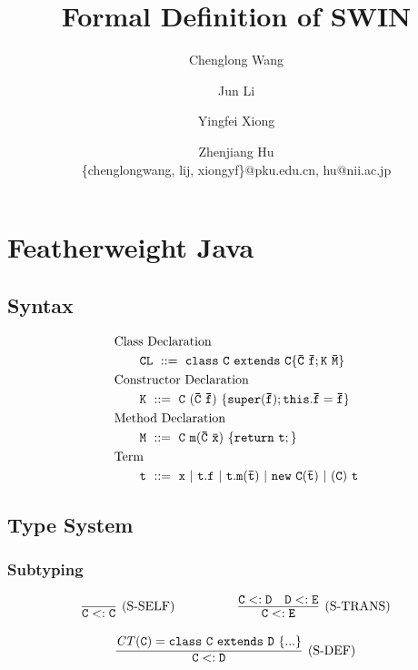\documentclass[letterpaper]{article}
\begin{document}
\title{Formal Definition of SWIN}
\author{Chenglong Wang \and Jun Li \and Yingfei Xiong \and Zhenjiang Hu \\ \{chenglongwang, lij, xiongyf\}@pku.edu.cn, hu@nii.ac.jp}

\date{}
\maketitle

\section{Featherweight Java}
\subsection{Syntax}
\begin{align*}
  & \mbox{Class Declaration}\\
  & \qquad\tt CL\ ::=\  \tt class\ C\ extends\ C \{\bar{C}\ \bar{f}; K\ \bar{M}\}\\
  & \mbox{Constructor Declaration}\\
  & \qquad\tt K \ ::=\  \tt C\ (\bar{C}\ \bar{f})\ \{ super(\bar{f}); this.\bar{f}=\bar{f}\}\\
  & \mbox{Method Declaration}\\
  & \qquad\tt M \ ::=\  \tt C\ m(\bar{C}\ \bar{x})\ \{ return\ t;\}\\
  & \mbox{Term}\\
  & \qquad\tt t \ ::=\  \tt x\ |\ t.f\ |\ t.m(\bar{t})\ |\ new\ C(\bar{t})\ |\ (C)\ t
\end{align*}
\subsection{Type System}
\subsubsection{Subtyping}
\[
\begin{array}{c c}
\infer[\text{(S-SELF)}]
  {\tt C<:C}
  {}
~~~~~~~~~~~~~~~
\infer[\text{(S-TRANS)}]
  {\tt C<:E}
  {\tt C<:D
  &\tt D<:E
  }
\end{array}
\]

\[
\begin{array}{c}

\infer[\text{(S-DEF)}]
  {\tt C<:D}
  {\tt \mathit{CT}(C)=class~C~extends~D~\{...\}
  }

\end{array}
\]
\end{document}
